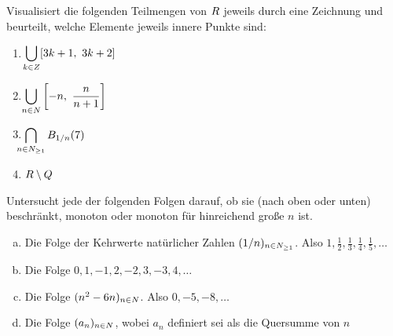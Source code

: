 \begin{aufg}
    Visualisiert die folgenden Teilmengen von $\relax R$ jeweils durch eine Zeichnung und beurteilt, welche Elemente jeweils innere Punkte sind:
    \begin{enumerate}
        \item \qquad$\smashoperator[l]{\bigcup_{k\in \Z}} [3k+1,\ 3k+2]$
        \item \qquad$\smashoperator[l]{\bigcup_{n\in \N}} \left[ -n,\ \frac{n}{n+1} \right] $
        \item \qquad$\smashoperator[l]{\bigcap_{n\in \N_{\ge 1}}} \bbB_{1/n}(7)$
        \item \qquad$\relax R\setminus \relax Q$
    \end{enumerate}
\end{aufg}


\begin{aufg} \label{aufg:folgen}
    Untersucht jede der folgenden Folgen darauf, ob sie (nach oben oder unten) beschränkt, monoton oder monoton für hinreichend große $n$ ist.
    \begin{enumerate}[a)]
        \item Die Folge der Kehrwerte natürlicher Zahlen $(1/n)_{n\in \relax N_{\ge 1}}$. Also $1,\frac{1}{2},\frac{1}{3},\frac{1}{4},\frac{1}{5},\dots$
        \item Die Folge $0,1,-1,2,-2,3,-3,4,\dots$
        \item Die Folge $(n^2-6n)_{n\in \relax N}$. Also $0,-5,-8,\dots$
        \item Die Folge $(a_n)_{n\in \relax N}$, wobei $a_n$ definiert sei als die Quersumme von $n$
    \end{enumerate}
\end{aufg}


